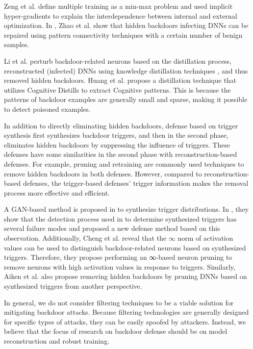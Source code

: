 \documentclass[conference]{IEEEtran}
\begin{document}
Zeng et al. \cite{b90}define multiple training as a min-max problem and used implicit hyper-gradients to
explain the interdependence between internal and external optimization.
In \cite{b91}, Zhao et al. show that hidden backdoors infecting DNNs can be repaired using pattern connectivity techniques with a certain number of benign samples.

Li et al. \cite{b92} perturb backdoor-related neurons based on the distillation process, reconstructed (infected) DNNs using knowledge
distillation techniques , and thus removed hidden backdoors.
Huang et al. \cite{b109} propose a distillation technique that utilizes Cognitive Distills to extract Cognitive patterns.
This is because the patterns of backdoor examples are generally small and sparse, making it possible to detect poisoned examples.


In addition to directly eliminating hidden backdoors, defense based on trigger synthesis first
synthesizes backdoor triggers, and then in the second phase, eliminates hidden backdoors by suppressing the influence of triggers.
These defenses have some similarities in the second phase with reconstruction-based defenses. For example,
pruning and retraining are commonly used techniques to remove hidden backdoors in both defenses. However,
compared to reconstruction-based defenses, the trigger-based defenses' trigger information makes the removal process more effective and efficient.

A GAN-based method is proposed in \cite{b93} to synthesize trigger distributions.
In \cite{b94}, they show that the detection process used in \cite{b95} to determine synthesized
triggers has several failure modes and proposed a new defense method based on this observation.
Additionally, Cheng et al. \cite{b96} reveal that the $\infty$ norm of activation values can be used to
distinguish backdoor-related neurons based on synthesized triggers. Therefore, they propose performing an
∞-based neuron pruning to remove neurons with high activation values in response to triggers.
Similarly, Aiken et al.\cite{b97} also propose removing hidden backdoors
by pruning DNNs based on synthesized triggers from another perspective.

In general, we do not consider filtering techniques to be a viable solution for mitigating backdoor attacks.
Because filtering technologies are generally designed for specific types of attacks, they can be easily spoofed by attackers.
Instead, we believe that the focus of research on backdoor defense should be on model reconstruction and robust training.
\end{document}
